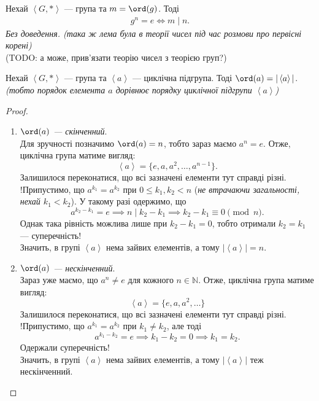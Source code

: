 \documentclass{math_library}
\begin{document}
\begin{lemma}
Нехай $\left< G,* \right>$ --- група та $m = \ord (g)$. Тоді 
\begin{align*}
g^n = e \iff m \mid n.
\end{align*}
\textit{Без доведення. (така ж лема була в теорії чисел під час розмови про первісні корені)}\\
(TODO: а може, прив'язати теорію чисел з теорією груп?)
\end{lemma}

\begin{proposition}
\label{order_of_a_group_is_the_order_of_a_cyclic_subgroup}
Нехай $\left<G,* \right>$ --- група та $\left<a\right>$ --- циклічна підгрупа. Тоді $\ord (a) = |\left<a\right>|$. \\ \textit{(тобто порядок елемента $a$ дорівнює порядку циклічної підгрупи $\left<a\right>$)}
\end{proposition}

\begin{proof}
\begin{enumerate}[topsep=0pt,wide=0pt,label={\Roman*.}]
\item \textit{$\ord(a)$ --- скінченний}.\\
Для зручності позначимо $\ord(a) = n$, тобто зараз маємо $a^n = e$. Отже, циклічна група матиме вигляд:
\[
\left<a\right> = \{e,a,a^2,\dots,a^{n-1}\}.
\]
Залишилося переконатися, що всі зазначені елементи тут справді різні.\\
!Припустимо, що $a^{k_1} = a^{k_2}$ при $0 \leq k_1,k_2 < n$ (\textit{не втрачаючи загальності, нехай $k_1 < k_2$}). У такому разі одержимо, що
\[
a^{k_2-k_1} = e \implies n \mid k_2-k_1 \implies k_2-k_1 \equiv 0 \pmod n.
\]
Однак така рівність можлива лише при $k_2 - k_1 = 0$, тобто отримали $k_2 = k_1$ --- суперечність!\\
Значить, в групі $\left<a\right>$ нема зайвих елементів, а тому $|\left<a\right>| = n$.

\item \textit{$\ord(a)$ --- нескінченний}.\\
Зараз уже маємо, що $a^n \neq e$ для кожного $n \in \mathbb{N}$. Отже, циклічна група матиме вигляд:
\[
\left<a\right> = \{ e,a,a^2,\dots \}
\]
Залишилося переконатися, що всі зазначені елементи тут справді різні.\\
!Припустимо, що $a^{k_1} = a^{k_2}$ при $k_1 \neq k_2$, але тоді
\[ 
a^{k_1-k_2} = e \implies k_1-k_2 = 0 \implies k_1 = k_2.
\]
Одержали суперечність!\\
Значить, в групі $\left<a\right>$ нема зайвих елементів, а тому $|\left<a\right>|$ теж нескінченний. \qedhere
\end{enumerate}
\end{proof}
\end{document}
